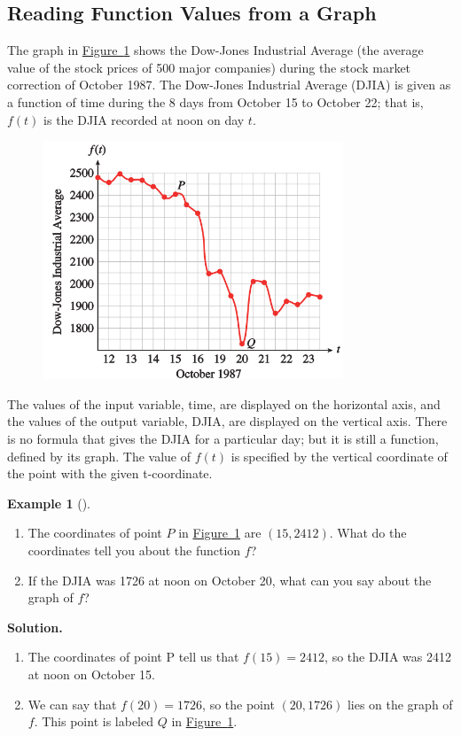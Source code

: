 \documentclass[10pt,]{book}
\theoremstyle{plain}
\theoremstyle{definition}
\theoremstyle{definition}
\newtheorem{example}[theorem]{Example}
\numberwithin{equation}{section}
\begin{document}
\subsection[Reading Function Values from a Graph]{Reading Function Values from a Graph}\label{subsection-13}
The graph in \hyperref[fig-DJIA]{Figure~\ref{fig-DJIA}}  shows the Dow-Jones Industrial Average (the average value of the stock prices of 500 major companies) during the stock market correction of October 1987. The Dow-Jones Industrial Average (DJIA) is given as a function of time during the 8 days from October 15 to October 22; that is, \(f(t)\) is the DJIA recorded at noon on day \(t\).
%
\leavevmode%
\begin{figure}
\centering
\includegraphics[width=0.80\textwidth,]{images/fig-DJIA.svg}\caption{\label{fig-DJIA}}
\end{figure}
\par
The values of the input variable, time, are displayed on the horizontal axis, and the values of the output variable, DJIA, are displayed on the vertical axis. There is no formula that gives the DJIA for a particular day; but it is still a function, defined by its graph. The value of \(f(t)\) is specified by the vertical coordinate of the point with the given t-coordinate.
%
\begin{example}[]\label{example-DJIA}
\leavevmode%
\begin{enumerate}[label=*\alph**]
\item\hypertarget{li-117}{}The coordinates of point \(P\) in \hyperref[fig-DJIA]{Figure~\ref{fig-DJIA}} are \((15, 2412)\). What do the coordinates tell you about the function \(f\)?\item\hypertarget{li-118}{}If the DJIA was 1726 at noon on October 20, what can you say about the graph of \(f\)?\end{enumerate}
\par\medskip\noindent%
\textbf{Solution.}\quad \leavevmode%
\begin{enumerate}[label=*\alph**]
\item\hypertarget{li-119}{}The coordinates of point P tell us that \(f(15) = 2412\), so the DJIA was 2412 at noon on October 15.\item\hypertarget{li-120}{}We can say that \(f(20) = 1726\), so the point \((20, 1726)\) lies on the graph of \(f\). This point is labeled \(Q\) in \hyperref[fig-DJIA]{Figure~\ref{fig-DJIA}}.\end{enumerate}
\end{example}
\end{document}
